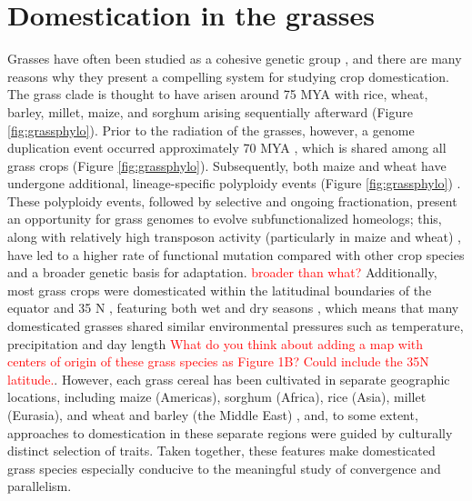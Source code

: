 \documentclass[12pt]{article}
\newcommand{\mbh}[1]{\textcolor{red}{\normalsize  #1}}
\begin{document}
\section*{Domestication in the grasses}
Grasses have often been studied as a cohesive genetic group \citep{pmid8379002, pmid11244100}, and there are many reasons why they present a compelling system for studying crop domestication.
The grass clade is thought to have arisen around 75 MYA \citep{BOUCHENAKKHELLADI2010, Kellogg2001} with rice, wheat, barley, millet, maize, and sorghum arising sequentially afterward (Figure \ref{fig:grassphylo}).
Prior to the radiation of the grasses, however, a genome duplication event occurred approximately 70 MYA \citep{Paterson2004}, which is shared among all grass crops (Figure \ref{fig:grassphylo}).
Subsequently, both maize and wheat have undergone additional, lineage-specific polyploidy events (Figure \ref{fig:grassphylo}) \citep{Levy2002}.
These polyploidy events, followed by selective and ongoing fractionation, present an opportunity for grass genomes to evolve subfunctionalized homeologs; this, along with relatively high transposon activity (particularly in maize and wheat) \citep{Wicker2016, Lisch2001}, have led to a higher rate of functional mutation compared with other crop species and a broader genetic basis for adaptation. \mbh{broader than what?}
Additionally, most grass crops were domesticated within the latitudinal boundaries of the equator and 35 N \citep{Jain1993, Gepts2010}, featuring both wet and dry seasons \citep{Jain1993}, which means that many domesticated grasses shared similar environmental pressures such as temperature, precipitation and day length \mbh{What do you think about adding a map with centers of origin of these grass species as Figure 1B?  Could include the 35N latitude.}.
However, each grass cereal has been cultivated in separate geographic locations, including maize (Americas), sorghum (Africa), rice (Asia), millet (Eurasia), and wheat and barley (the Middle East) \citep{Glmin2009}, and, to some extent, approaches to domestication in these separate regions were guided by culturally distinct selection of traits.
Taken together, these features make domesticated grass species especially conducive to the meaningful study of convergence and parallelism.
\end{document}
